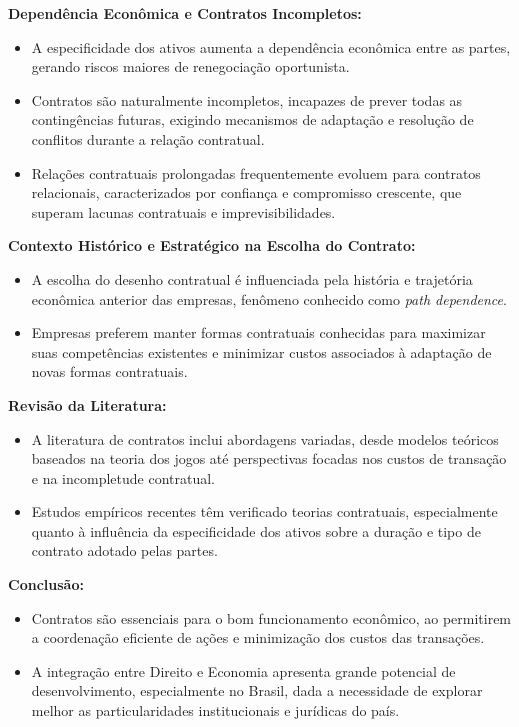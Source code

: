 \documentclass[a4paper,12pt]{article}[abntex2]
\begin{document}
\textbf{Dependência Econômica e Contratos Incompletos:}
\begin{itemize}
\item A especificidade dos ativos aumenta a dependência econômica entre as partes, gerando riscos maiores de renegociação oportunista.
\item Contratos são naturalmente incompletos, incapazes de prever todas as contingências futuras, exigindo mecanismos de adaptação e resolução de conflitos durante a relação contratual.
\item Relações contratuais prolongadas frequentemente evoluem para contratos relacionais, caracterizados por confiança e compromisso crescente, que superam lacunas contratuais e imprevisibilidades.
\end{itemize}

\textbf{Contexto Histórico e Estratégico na Escolha do Contrato:}
\begin{itemize}
\item A escolha do desenho contratual é influenciada pela história e trajetória econômica anterior das empresas, fenômeno conhecido como \textit{path dependence}.
\item Empresas preferem manter formas contratuais conhecidas para maximizar suas competências existentes e minimizar custos associados à adaptação de novas formas contratuais.
\end{itemize}

\textbf{Revisão da Literatura:}
\begin{itemize}
\item A literatura de contratos inclui abordagens variadas, desde modelos teóricos baseados na teoria dos jogos até perspectivas focadas nos custos de transação e na incompletude contratual.
\item Estudos empíricos recentes têm verificado teorias contratuais, especialmente quanto à influência da especificidade dos ativos sobre a duração e tipo de contrato adotado pelas partes.
\end{itemize}

\textbf{Conclusão:}
\begin{itemize}
\item Contratos são essenciais para o bom funcionamento econômico, ao permitirem a coordenação eficiente de ações e minimização dos custos das transações.
\item A integração entre Direito e Economia apresenta grande potencial de desenvolvimento, especialmente no Brasil, dada a necessidade de explorar melhor as particularidades institucionais e jurídicas do país.
\end{itemize}
\end{document}
